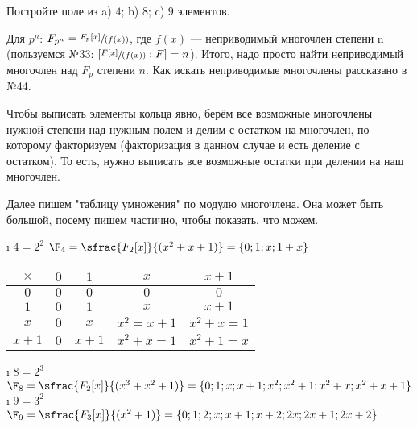 \begin{problem}[45 (11.3)]
Постройте поле из a) $4$; b) $8$; c) $9$ элементов.
\end{problem}

\begin{solution}

Для \(p^n\): \(F_{p^n} = \sfrac{F_p[x]}{(f(x))}\), где \(f(x)\) --- неприводимый многочлен степени n (пользуемся №33: $[\sfrac{F[x]}{(f(x))}:F] = n$). Итого, надо просто найти неприводимый многочлен над \(F_p\) степени \(n\). Как искать неприводимые многочлены рассказано в №44.

Чтобы выписать элементы кольца явно, берём все возможные многочлены нужной степени над нужным полем и делим с остатком на многочлен, по которому факторизуем (факторизация в данном случае и есть деление с остатком). То есть, нужно выписать все возможные остатки при делении на наш многочлен.

Далее пишем "таблицу умножения" по модулю многочлена. Она может быть большой, посему пишем частично, чтобы показать, что можем.

\begin{enumerate}
\def\labelenumi{\alph{enumi})}
\tightlist
\i
  \(4=2^2\)
  \(\F_4 = \sfrac{F_2[x]}{(x^2+x+1)} = \{0; 1;x;1+x\}\)
  
  
	\begin{table}[H]
	\centering
	\begin{tabular}{|c|c|c|c|c|}
	\hline
	$\times$  & $0$ & $1$ & $x$    & $x+1$ \\ \hline
	$0$  & $0$ & $0$  & $0$    & $0$ \\ \hline
	$1$  & $0$ & $1$  & $x$    & $x+1$\\ \hline
	$x$  & $0$ & $x$  & $x^2=x+1$ & $x^2+x=1$\\ \hline
	$x+1$& $0$ & $x+1$& $x^2+x=1$ & $x^2+1=x$\\ \hline
	\end{tabular}
	\end{table}
\i
  \(8=2^3\)
  \(\F_8 = \sfrac{F_2[x]}{(x^3+x^2+1)} = \{0; 1; x; x+1; x^2; x^2+1; x^2+x; x^2+x+1 \}\)
\i
  \(9=3^2\)
  \(\F_9 = \sfrac{F_3[x]}{(x^2+1)} = \{ 0; 1; 2; x; x+1; x+2; 2x; 2x+1; 2x+2\}\)
\end{enumerate}



\end{solution}


